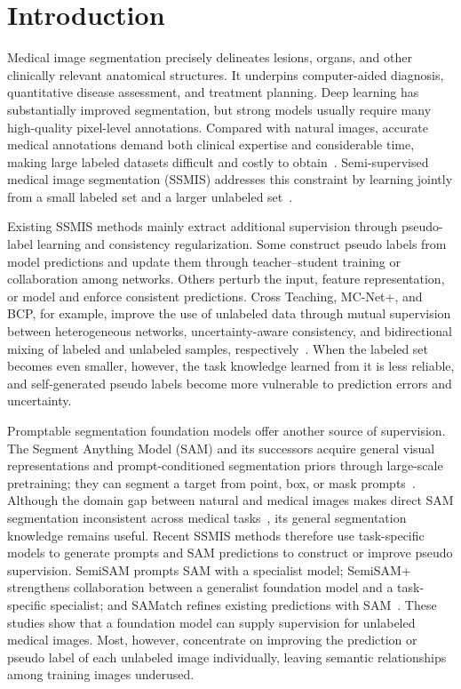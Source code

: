 \documentclass[a4paper,fleqn]{cas-dc}
\begin{document}
\section{Introduction}

Medical image segmentation precisely delineates lesions, organs, and other clinically relevant anatomical structures. It underpins computer-aided diagnosis, quantitative disease assessment, and treatment planning. Deep learning has substantially improved segmentation, but strong models usually require many high-quality pixel-level annotations. Compared with natural images, accurate medical annotations demand both clinical expertise and considerable time, making large labeled datasets difficult and costly to obtain~\cite{hesamian2019deep,tajbakhsh2020embracing}. Semi-supervised medical image segmentation (SSMIS) addresses this constraint by learning jointly from a small labeled set and a larger unlabeled set~\cite{jiao2024learning}.

Existing SSMIS methods mainly extract additional supervision through pseudo-label learning and consistency regularization. Some construct pseudo labels from model predictions and update them through teacher--student training or collaboration among networks. Others perturb the input, feature representation, or model and enforce consistent predictions. Cross Teaching, MC-Net+, and BCP, for example, improve the use of unlabeled data through mutual supervision between heterogeneous networks, uncertainty-aware consistency, and bidirectional mixing of labeled and unlabeled samples, respectively~\cite{luo2022crossteaching,wu2022mcnet,bai2023bcp}. When the labeled set becomes even smaller, however, the task knowledge learned from it is less reliable, and self-generated pseudo labels become more vulnerable to prediction errors and uncertainty.

Promptable segmentation foundation models offer another source of supervision. The Segment Anything Model (SAM) and its successors acquire general visual representations and prompt-conditioned segmentation priors through large-scale pretraining; they can segment a target from point, box, or mask prompts~\cite{kirillov2023segment}. Although the domain gap between natural and medical images makes direct SAM segmentation inconsistent across medical tasks~\cite{mazurowski2023samexperiment,ma2024medsam}, its general segmentation knowledge remains useful. Recent SSMIS methods therefore use task-specific models to generate prompts and SAM predictions to construct or improve pseudo supervision. SemiSAM prompts SAM with a specialist model; SemiSAM+ strengthens collaboration between a generalist foundation model and a task-specific specialist; and SAMatch refines existing predictions with SAM~\cite{zhang2023semisam,zhang2025semisamplus,xu2024samatch}. These studies show that a foundation model can supply supervision for unlabeled medical images. Most, however, concentrate on improving the prediction or pseudo label of each unlabeled image individually, leaving semantic relationships among training images underused.
\end{document}
